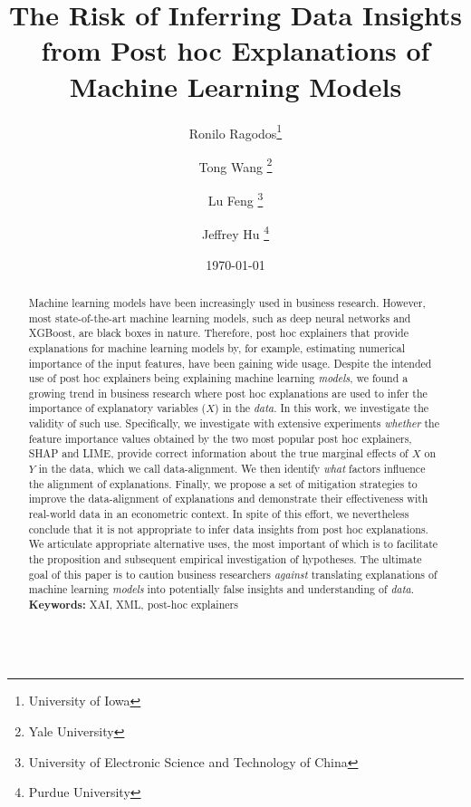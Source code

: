 \documentclass[12pt]{article}  %
\begin{document}
\begin{titlepage}
\title{The Risk of Inferring Data Insights from Post hoc Explanations of Machine Learning Models}
\author{Ronilo Ragodos\thanks{University of Iowa} \and Tong Wang \thanks{Yale University} \and Lu Feng \thanks{University of Electronic Science and Technology of China} \and Jeffrey Hu \thanks{Purdue University}}
\date{\today}
\maketitle
\begin{abstract}
\noindent Machine learning models have been increasingly used in business research. However, most state-of-the-art machine learning models, such as deep neural networks and XGBoost, are black boxes in nature. Therefore, post hoc explainers that provide explanations for machine learning models by, for example, estimating numerical importance of the input features, have been gaining wide usage. Despite the intended use of post hoc explainers being explaining machine learning \textit{models}, we found a growing trend in business research where post hoc explanations are used to infer the importance of explanatory variables ($X$) in the \textit{data}. In this work, we investigate the validity of such use. Specifically, we investigate with extensive experiments \emph{whether} the feature importance values obtained by the two most popular post hoc explainers, SHAP and LIME, provide correct information about the true marginal effects of $X$ on $Y$ in the data, which we call data-alignment. We then identify \emph{what} factors influence the alignment of explanations. Finally, we propose a set of mitigation strategies to improve the data-alignment of explanations and demonstrate their effectiveness with real-world data in an econometric context. In spite of this effort, we nevertheless conclude that it is not appropriate to infer data insights from  post hoc explanations. We articulate appropriate alternative uses, the most important of which is to facilitate the proposition and subsequent empirical investigation of hypotheses. The ultimate goal of this paper is to caution business researchers \textit{against} translating explanations of machine learning \textit{models} into potentially false insights and understanding of \textit{data}.
\vspace{0in}\\
\noindent\textbf{Keywords:} XAI, XML, post-hoc explainers\\
\vspace{0in}\\

\bigskip
\end{abstract}
\setcounter{page}{0}
\thispagestyle{empty}
\end{titlepage}
\pagebreak \newpage
\end{document}
